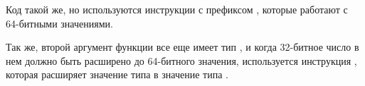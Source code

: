Код такой же, но используются инструкции с префиксом , которые работают 
с 64-битными значениями.

Так же, второй аргумент функции все еще имеет тип , и когда 32-битное число в нем
должно быть расширено до 64-битного значения, используется инструкция , 
которая расширяет значение типа  в значение типа .
